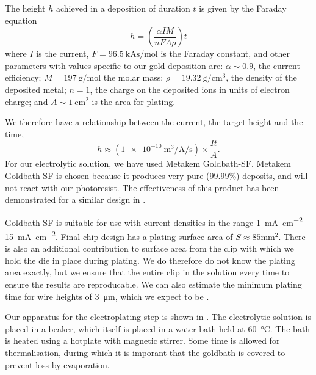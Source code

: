 The height $h$ achieved in a deposition of duration $t$ is given by the Faraday
equation~\cite{Ruythooren_2000}
%
\begin{equation}
  h = \left(\frac{\alpha I M}{nFA\rho}\right)t
  \label{fab:eqn:faraday}
\end{equation}
%
where $I$ is the current, $F=\SI{96.5}{\kilo\ampere\second\per\mole}$ is the
Faraday constant, and other parameters with values specific to our gold
deposition are: $\alpha\sim0.9$, the current efficiency; $M =
\SI{197}{\gram\per\mole}$ the molar mass;
$\rho=\SI{19.32}{\gram\per\centi\meter\cubed}$, the density of the deposited
metal; $n=1$, the charge on the deposited ions in units of electron charge; and
$A\sim\SI{1}{\centi\meter\squared}$ is the area for plating.

We therefore have a relationship between the current, the target height and the
time,
%
\begin{equation}
  h \approx \left(
  \SI[per-mode=fraction]{1e-10}{\meter\cubed\per\ampere\per\second} \right)
  \times\frac{It}{A}.
\end{equation}
%
For our electrolytic solution, we have used Metakem Goldbath-SF.
Metakem Goldbath-SF is chosen because it produces very pure (99.99\%) deposits,
and will not react with our photoresist. The effectiveness of this product has
been demonstrated for a similar design in .
%

Goldbath-SF is suitable for use with current densities in the range
\SIrange{1}{15}{\milli\ampere\per\centi\meter\squared}. Final chip design has a
plating surface area of $S\approx85\si{\milli\meter\squared}$. There is also an
additional contribution to surface area from the clip with which we hold the
die in place during plating. We do therefore do not know the plating area
exactly, but we ensure that the entire clip in the solution every time to
ensure the results are reproducable. We can also estimate the minimum plating
time for wire heights of \SI{3}{\micro\meter}, which we expect to be
.


Our apparatus for the electroplating step is shown in
. The electrolytic solution is placed in a
beaker, which itself is placed in a water bath held at \SI{60}{\celsius}. The
bath is heated using a hotplate with magnetic stirrer. Some time is allowed for
thermalisation, during which it is imporant that the goldbath is covered to
prevent loss by evaporation.

